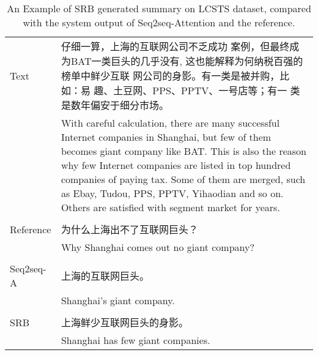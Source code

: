\documentclass{clv3}
\begin{document}
\begin{CJK*}{UTF8}{gbsn}
\begin{table}[tb]
	\centering
	\caption{An Example of SRB generated summary on LCSTS dataset, compared with the system output of Seq2seq-Attention and the reference.
	}\label{tab6}
	\begin{tabular}{|l p{10.5cm}@{~} |}
		\hline
		Text & 仔细一算，上海的互联网公司不乏成功
		案例，但最终成为BAT一类巨头的几乎没有,
		这也能解释为何纳税百强的榜单中鲜少互联
		网公司的身影。有一类是被并购，比如：易
		趣、土豆网、PPS、PPTV、一号店等；有一
		类是数年偏安于细分市场。\\
		& With careful calculation, there are many successful Internet companies in Shanghai, but few
		of them becomes giant company like BAT. This is also the reason why few Internet companies are listed in top hundred companies of paying tax. Some of them are merged, such as Ebay, Tudou, PPS, PPTV, Yihaodian and so on.
		Others are satisfied with segment market for years.\\
		&\\
		Reference &为什么上海出不了互联网巨头？\\
		&Why Shanghai comes out no giant company?\\
		&\\
		Seq2seq-A&上海的互联网巨头。\\
		&Shanghai's giant company.\\
		&\\
		SRB&上海鲜少互联网巨头的身影。\\
		&Shanghai has few giant companies.\\
		\hline
	\end{tabular}
	\vspace{-0.01in}
\end{table}



\end{CJK*}
\end{document}
